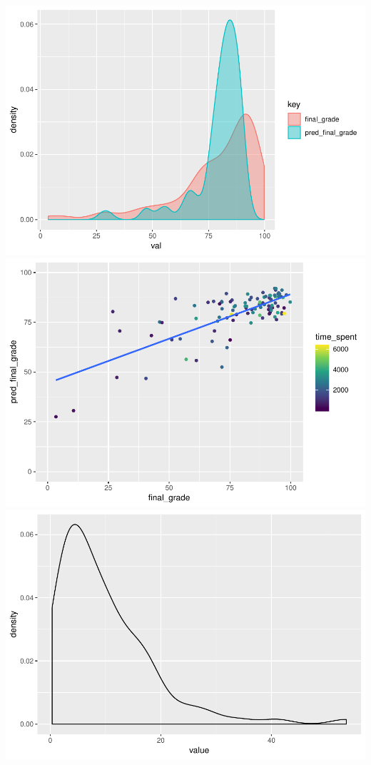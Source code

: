 \documentclass[]{apa6}
\theoremstyle{definition}
\theoremstyle{definition}
\theoremstyle{definition}
\theoremstyle{remark}
\begin{document}
\includegraphics{LAK_Manuscript_files/figure-latex/unnamed-chunk-1-1.pdf}
\includegraphics{LAK_Manuscript_files/figure-latex/unnamed-chunk-1-2.pdf}
\includegraphics{LAK_Manuscript_files/figure-latex/unnamed-chunk-1-3.pdf}
\end{document}
